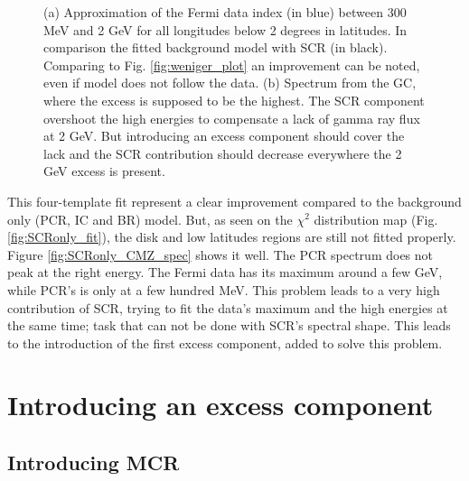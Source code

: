 \begin{figure}[h]
\begin{minipage}[h]{0.45\textwidth}
	  \subcaption{}
	  \label{fig:SCRonly_CMZ_spec}
  \end{minipage}	 
  \caption[SCR fit spectra.]{(a) Approximation of the Fermi data index (in blue) between 300 MeV and 2 GeV for all longitudes below 2 degrees in latitudes. In comparison the fitted background model with SCR (in black). Comparing to Fig. \ref{fig:weniger_plot} an improvement can be noted, even if model does not follow the data. (b) Spectrum from the GC, where the excess is supposed to be the highest. The SCR component overshoot the high energies to compensate a lack of gamma ray flux at 2 GeV. But introducing an excess component should cover the lack and the SCR contribution should decrease everywhere the 2 GeV excess is present.}
	  \label{fig:SCRonly_spectra}
\end{figure}


This four-template fit represent a clear improvement compared to the background only (PCR, IC and BR) model. But, as seen on the $\chi^2$ distribution map (Fig. \ref{fig:SCRonly_fit}), the disk and low latitudes regions are still not fitted properly. Figure \ref{fig:SCRonly_CMZ_spec} shows it well. The PCR spectrum does not peak at the right energy. The Fermi data has its maximum around a few GeV, while PCR's is only at a few hundred MeV. This problem leads to a very high contribution of SCR, trying to fit the data's maximum and the high energies at the same time; task that can not be done with SCR's spectral shape.
This leads to the introduction of the first excess component, added to solve this problem.








\newpage
\section{Introducing an excess component}
\subsection{Introducing MCR}

